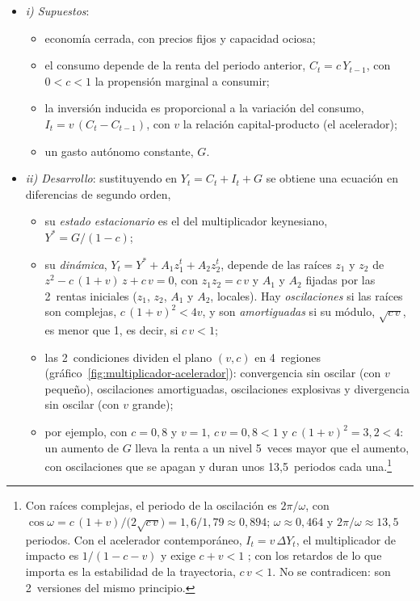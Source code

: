 \documentclass[11pt]{article}
\begin{document}
\begin{itemize}
\item \emph{i) Supuestos}:
  \begin{itemize}
  \item economía cerrada, con precios fijos y capacidad ociosa;
  \item el consumo depende de la renta del periodo anterior, $C_t=c\,Y_{t-1}$, con $0<c<1$ la propensión marginal a consumir;
  \item la inversión inducida es proporcional a la variación del consumo, $I_t=v\,(C_t-C_{t-1})$, con $v$ la relación capital-producto (el acelerador);
  \item un gasto autónomo constante, $G$.
  \end{itemize}
\item \emph{ii) Desarrollo}: sustituyendo en $Y_t=C_t+I_t+G$ se obtiene una ecuación en diferencias de segundo orden,
  \begin{itemize}
  \item su \emph{estado estacionario} es el del multiplicador keynesiano, $Y^*=G/(1-c)$;
  \item su \emph{dinámica}, $Y_t=Y^*+A_1z_1^t+A_2z_2^t$, depende de las raíces $z_1$ y $z_2$ de $z^2-c\,(1+v)\,z+c\,v=0$, con $z_1z_2=c\,v$ y $A_1$ y $A_2$ fijadas por las 2~rentas iniciales ($z_1$, $z_2$, $A_1$ y $A_2$, locales). Hay \emph{oscilaciones} si las raíces son complejas, $c\,(1+v)^2<4v$, y son \emph{amortiguadas} si su módulo, $\sqrt{c\,v}$, es menor que 1, es decir, si $c\,v<1$;
  \item las 2~condiciones dividen el plano $(v,c)$ en 4~regiones (gráfico~\ref{fig:multiplicador-acelerador}): convergencia sin oscilar (con $v$ pequeño), oscilaciones amortiguadas, oscilaciones explosivas y divergencia sin oscilar (con $v$ grande);
  \item por ejemplo, con $c=0{,}8$ y $v=1$, $c\,v=0{,}8<1$ y $c\,(1+v)^2=3{,}2<4$: un aumento de $G$ lleva la renta a un nivel 5~veces mayor que el aumento, con oscilaciones que se apagan y duran unos 13,5~periodos cada una.\footnote{Con raíces complejas, el periodo de la oscilación es $2\pi/\omega$, con $\cos\omega=c\,(1+v)/\big(2\sqrt{c\,v}\big)=1{,}6/1{,}79\approx0{,}894$; $\omega\approx0{,}464$ y $2\pi/\omega\approx13{,}5$ periodos. Con el acelerador contemporáneo, $I_t=v\,\Delta Y_t$, el multiplicador de impacto es $1/(1-c-v)$ y exige $c+v<1$ ; con los retardos de  lo que importa es la estabilidad de la trayectoria, $c\,v<1$. No se contradicen: son 2~versiones del mismo principio.}

\end{itemize}
\end{itemize}
\end{document}
